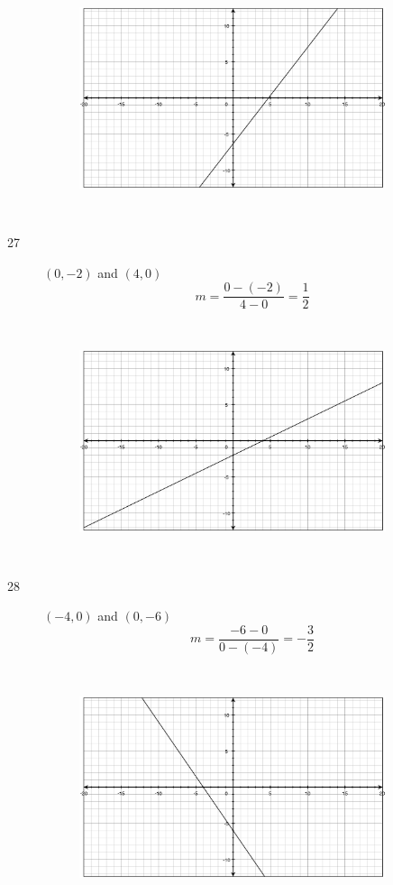 \documentclass[fleqn,addpoints]{exam}
\begin{document}
\begin{description}
\begin{figure}[H]
  \includegraphics[width=9cm,height=7cm]{p374/26}
\end{figure}


\item[27]
$(0, -2)$ and $(4, 0)$
\[
  m = \frac{0-(-2)}{4-0} = \frac{1}{2}
\]

\begin{figure}[H]
  \includegraphics[width=9cm,height=7cm]{p374/27}
\end{figure}

\item[28]
$(-4, 0)$ and $(0, -6)$
\[
  m = \frac{-6-0}{0- (-4)} = - \frac{3}{2}
\]

\begin{figure}[H]
  \includegraphics[width=9cm,height=7cm]{p374/28}
\end{figure}



\end{description}
\end{document}
